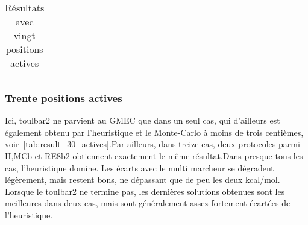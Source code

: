 \begin{table}[h]
{\begin{tabular}{cccccc}
 \end{tabular}
}   
 \caption{Résultats  avec vingt positions actives }
\label{tab:result_20_actives}   
\end{table}


   \subsubsection{Trente positions actives}
Ici, toulbar2 ne parvient au GMEC que dans un seul cas, qui d'ailleurs est également obtenu par l'heuristique et le Monte-Carlo à moins de trois centièmes, voir~\ref{tab:result_30_actives}.Par ailleurs, dans treize cas, deux protocoles parmi H,MCb et RE8b2 obtiennent exactement le même résultat.Dans presque tous les cas, l'heuristique domine. Les écarts avec le multi marcheur se dégradent légèrement, mais restent bons, ne dépassant que de peu les deux kcal/mol. Lorsque le toulbar2 ne termine pas, les  dernières solutions obtenues sont les meilleures dans deux cas, mais sont généralement assez fortement écartées de l'heuristique.     


